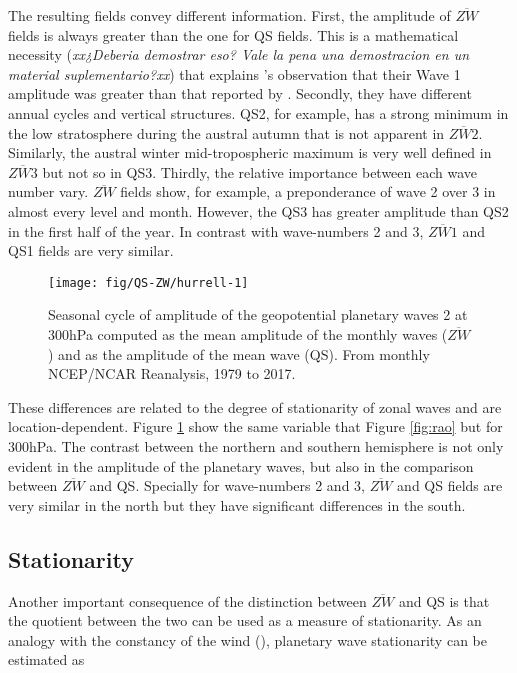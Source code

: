 \documentclass[draft,linenumbers]{agujournal2018}
\begin{document}
The resulting fields convey different information. First, the amplitude
of \(\overline{ZW}\) fields is always greater than the one for QS
fields. This is a mathematical necessity (\emph{xx¿Deberia demostrar
eso? Vale la pena una demostracion en un material suplementario?xx})
that explains \citet{Rao2004}'s observation that their Wave 1 amplitude
was greater than that reported by \citet{Hurrell1998}. Secondly, they
have different annual cycles and vertical structures. QS2, for example,
has a strong minimum in the low stratosphere during the austral autumn
that is not apparent in \(\overline{ZW2}\). Similarly, the austral
winter mid-tropospheric maximum is very well defined in
\(\overline{ZW3}\) but not so in QS3. Thirdly, the relative importance
between each wave number vary. \(\overline{ZW}\) fields show, for
example, a preponderance of wave 2 over 3 in almost every level and
month. However, the QS3 has greater amplitude than QS2 in the first half
of the year. In contrast with wave-numbers 2 and 3, \(\overline{ZW1}\)
and QS1 fields are very similar.

\begin{figure}[h]

{\centering \texttt{[image: fig/QS-ZW/hurrell-1]} 

}

\caption{Seasonal cycle of amplitude of the geopotential planetary waves 2 at 300hPa computed as the mean amplitude of the monthly waves ($\overline{ZW}$) and as the amplitude of the mean wave (QS). From monthly NCEP/NCAR Reanalysis, 1979 to 2017.}\label{fig:hurrell}
\end{figure}

These differences are related to the degree of stationarity of zonal
waves and are location-dependent. Figure \ref{fig:hurrell} show the same
variable that Figure \ref{fig:rao} but for 300hPa. The contrast between
the northern and southern hemisphere is not only evident in the
amplitude of the planetary waves, but also in the comparison between
\(\overline{ZW}\) and QS. Specially for wave-numbers 2 and 3,
\(\overline{ZW}\) and QS fields are very similar in the north but they
have significant differences in the south.

\subsection{Stationarity}

Another important consequence of the distinction between
\(\overline{ZW}\) and QS is that the quotient between the two can be
used as a measure of stationarity. As an analogy with the constancy of
the wind (\citet{Singer1967}), planetary wave stationarity can be
estimated as
\end{document}
